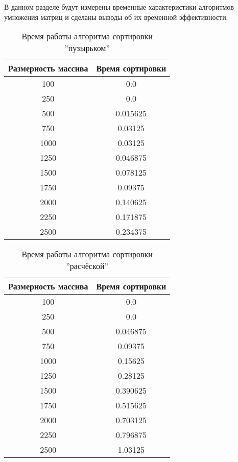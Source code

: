 В данном разделе будут измерены временные характеристики алгоритмов умножения матриц и сделаны выводы об их временной эффективности.

\begin{table}[h!]
  \begin{center}
    \captionsetup{justification=raggedright}
    \caption{Время работы алгоритма сортировки ''пузырьком''}
    \label{tab:workcost_classic}
    \begin{tabular}{c|c}
      \textbf{Размерность массива} & \textbf{Время сортировки}\\
      \hline
	100 & 0.0\\
	250 & 0.0\\      
	500 & 0.015625\\ 
	750 & 0.03125\\  
	1000 & 0.03125\\ 
	1250 & 0.046875\\
	1500 & 0.078125\\
	1750 & 0.09375\\ 
	2000 & 0.140625\\
	2250 & 0.171875\\
	2500 & 0.234375\\
    \end{tabular}
  \end{center}
\end{table}

\begin{table}[h!]
  \begin{center}
    \captionsetup{justification=raggedright}
    \caption{Время работы алгоритма сортировки ''расчёской''}
    \label{tab:workcost_classic}
    \begin{tabular}{c|c}
      \textbf{Размерность массива} & \textbf{Время сортировки}\\
      \hline
	100 & 0.0\\      
	250 & 0.0\\      
	500 & 0.046875\\
	750 & 0.09375\\
	1000 & 0.15625\\
	1250 & 0.28125\\
	1500 & 0.390625\\
	1750 & 0.515625\\
	2000 & 0.703125\\
	2250 & 0.796875\\
	2500 & 1.03125\\
    \end{tabular}
  \end{center}
\end{table}

